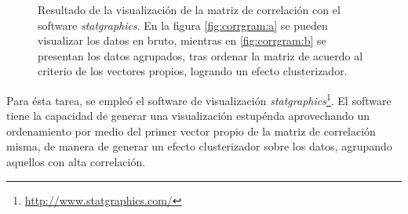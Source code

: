 \begin{figure}[h!]
	\centering
	\hspace*{\fill}
	\hfill
	\caption{Resultado de la visualización de la matriz de correlación con el software \emph{statgraphics}. En la figura \ref{fig:corrgram:a} se pueden visualizar los datos en bruto, mientras en \ref{fig:corrgram:b} se presentan los datos agrupados, tras ordenar la matriz de acuerdo al criterio de los vectores propios, logrando un efecto clusterizador.}
	\label{fig:corrmatrix}
	\hspace*{\fill}
\end{figure}


Para ésta tarea, se empleó el software de visualización \emph{statgraphics}\footnote{\url{http://www.statgraphics.com/}}. El software tiene la capacidad de generar una visualización estupénda aprovechando un ordenamiento por medio del primer vector propio de la matriz de correlación misma, de manera de generar un efecto clusterizador sobre los datos, agrupando aquellos con alta correlación.

